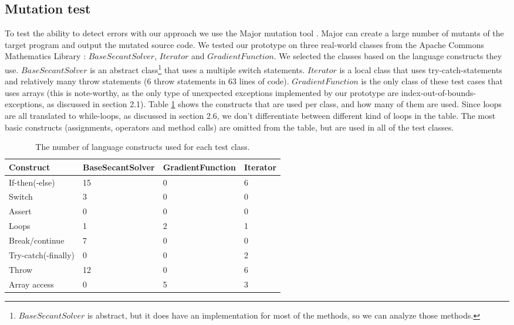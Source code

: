 \documentclass[a4paper, fleqn]{article}
\begin{document}
\subsection{Mutation test}
To test the ability to detect errors with our approach we use the Major mutation tool \cite{major}. Major can create a large number of mutants of the target program and output the mutated source code. We tested our prototype on three real-world classes from the Apache Commons Mathematics Library \cite{apachemath}: $BaseSecantSolver$, $Iterator$ and $GradientFunction$. We selected the classes based on the language constructs they use. $BaseSecantSolver$ is an abstract class\footnote{$BaseSecantSolver$ is abstract, but it does have an implementation for most of the methods, so we can analyze those methods.} that uses a multiple switch statements. $Iterator$ is a local class that uses try-catch-statements and relatively many throw statements (6 throw statements in 63 lines of code). $GradientFunction$ is the only class of these test cases that uses arrays (this is note-worthy, as the only type of unexpected exceptions implemented by our prototype are index-out-of-bounds-exceptions, as discussed in section 2.1). Table \ref{constructs used} shows the constructs that are used per class, and how many of them are used. Since loops are all translated to while-loops, as discussed in section 2.6, we don't differentiate between different kind of loops in the table. The most basic constructs (assignments, operators and method calls) are omitted from the table, but are used in all of the test classes.

\begin{table}
    \begin{tabular}{ | p{3.0cm}  | p{2.42cm} | p{2.42cm} | p{2.42cm} |}
    \hline
    Construct & BaseSecantSolver & GradientFunction & Iterator  \\ \hline
     If-then(-else) & 15 & 0 & 6 \\ \hline
     Switch & 3 & 0 & 0 \\ \hline
     Assert & 0 & 0 & 0 \\ \hline
     Loops & 1 & 2 & 1 \\ \hline
     Break/continue & 7 & 0 & 0 \\ \hline
     Try-catch(-finally) & 0 & 0 & 2 \\ \hline
     Throw & 12 & 0 & 6 \\ \hline
     Array access & 0 & 5 & 3 \\ \hline
    \end{tabular}
\caption{The number of language constructs used for each test class.}
\label{constructs used}
\end{table}
\end{document}
